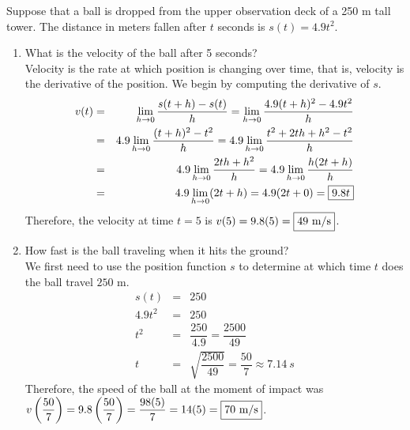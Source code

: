 \documentclass{book}
\begin{document}
\begin{Exam} Suppose that a ball is dropped from the upper observation deck of a 250 m tall tower. The distance in meters fallen after $t$ seconds is $s(t) = 4.9t^2$.
\begin{enumerate}
\item What is the velocity of the ball after 5 seconds?\\

Velocity is the rate at which position is changing over time, that is, velocity is the derivative of the position. We begin by computing the derivative of $s$.
\begin{eqnarray*}
v(t) &=& \lim_{h\to 0} \dfrac{s(t+h) -s(t)}{h} = \lim_{h\to 0} \dfrac{4.9(t+h)^2-4.9t^2}{h}\\
&=& 4.9\lim_{h\to 0} \dfrac{(t+h)^2-t^2}{h} = 4.9\lim_{h\to 0} \dfrac{t^2+2th+h^2-t^2}{h}\\
&=& 4.9\lim_{h\to 0} \dfrac{2th+h^2}{h} = 4.9\lim_{h\to 0} \dfrac{h(2t+h)}{h} \\
&=& 4.9\lim_{h\to 0} (2t+h) = 4.9(2t+0) = \fbox{$9.8t$} 
\end{eqnarray*} Therefore, the velocity at time $t=5$ is $v(5) = 9.8(5) = \fbox{$49$\ m/s}$.\\

\item How fast is the ball traveling when it hits the ground?\\

We first need to use the position function $s$ to determine at which time $t$ does the ball travel $250$ m. 
\begin{eqnarray*}
s(t) &=& 250\\
4.9t^2&=& 250\\
t^2 &=& \dfrac{250}{4.9} = \dfrac{2500}{49}\\
t &=& \sqrt{\dfrac{2500}{49}} = \dfrac{50}{7} \approx 7.14\ s
\end{eqnarray*}
Therefore, the speed of the ball at the moment of impact was $v\left(\dfrac{50}{7}\right) = 9.8\left(\dfrac{50}{7}\right) = \dfrac{98(5)}{7} =  14(5) = \fbox{$70$ m/s}$.
\end{enumerate}
\end{Exam}

\vfill
{}
\pagebreak
\end{document}
